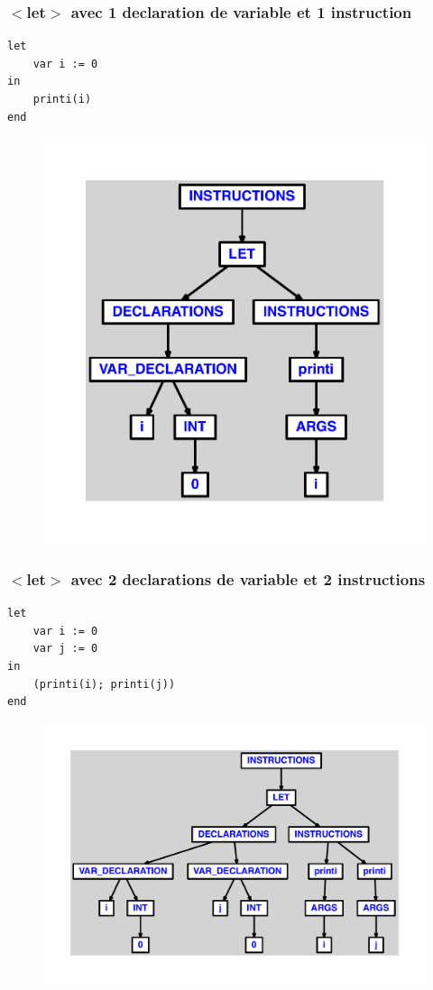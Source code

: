 \documentclass{article}
\begin{document}
\subsubsection{$ < $let$ > $ avec 1 declaration de variable et 1 instruction}
\begin{lstlisting}
let
	var i := 0
in
	printi(i)
end
\end{lstlisting}
\newpage
\begin{figure}[H]
\centering
\includegraphics[max width=\textwidth]{ast/ast_275.pdf}
\end{figure}
\newpage
\subsubsection{$ < $let$ > $ avec 2 declarations de variable et 2 instructions}
\begin{lstlisting}
let
	var i := 0
	var j := 0
in
	(printi(i); printi(j))
end
\end{lstlisting}
\newpage
\begin{figure}[H]
\centering
\includegraphics[max width=\textwidth]{ast/ast_276.pdf}
\end{figure}
\newpage
\end{document}
